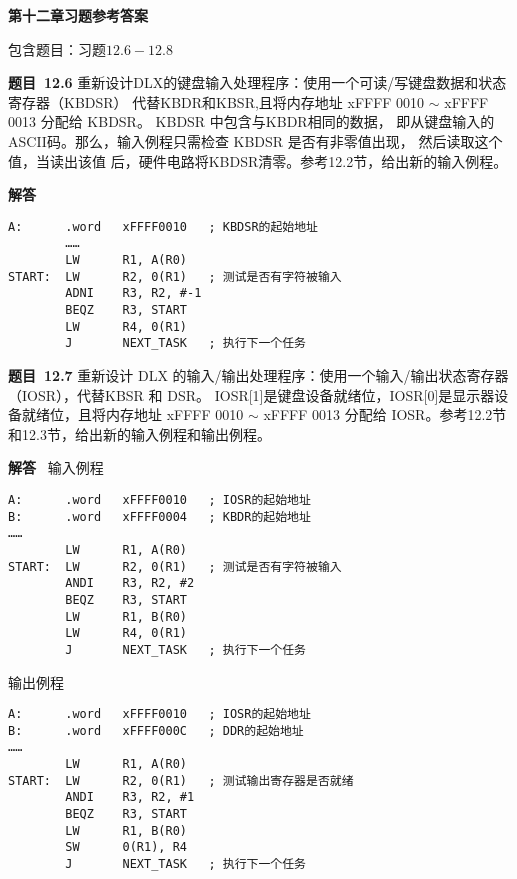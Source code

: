 \documentclass[10pt,a4paper,UTF8]{ctexart}
\newcommand{\problemname}{待定义}
\newenvironment{problem}{\begin{shaded}\par\noindent\textbf{题目\  \problemname}}{\end{shaded}\par}
\newenvironment{solution}{\par\noindent\textbf{解答}\ }{\par}
\begin{document}
\begin{center}
\LARGE\textbf{第十二章习题参考答案}
\end{center}

{\kaishu 包含题目：习题$12.6-12.8$}



	



\renewcommand{\problemname}{12.6}
\begin{problem}
	重新设计DLX的键盘输入处理程序：使用一个可读/写键盘数据和状态寄存器（KBDSR）
	代替KBDR和KBSR,且将内存地址 xFFFF 0010 $\sim$ xFFFF 0013 分配给 KBDSR。
	KBDSR 中包含与KBDR相同的数据，
	即从键盘输入的ASCII码。那么，输入例程只需检查 KBDSR 是否有非零值出现，
	然后读取这个值，当读出该值
	后，硬件电路将KBDSR清零。参考12.2节，给出新的输入例程。
\end{problem}

\begin{solution}
	\begin{lstlisting}
A:		.word	xFFFF0010	; KBDSR的起始地址
		…… 
		LW		R1, A(R0) 
START:	LW		R2, 0(R1)	; 测试是否有字符被输入
		ADNI	R3, R2, #-1 
		BEQZ	R3, START 
		LW		R4, 0(R1) 
		J		NEXT_TASK	; 执行下一个任务
	\end{lstlisting}
\end{solution}


\renewcommand{\problemname}{12.7}
\begin{problem}
	重新设计 DLX 的输入/输出处理程序：使用一个输入/输出状态寄存器（IOSR），代替KBSR 和 DSR。
	IOSR[1]是键盘设备就绪位，IOSR[0]是显示器设备就绪位，且将内存地址 xFFFF 0010 $\sim$ xFFFF 0013 分配给
	IOSR。参考12.2节和12.3节，给出新的输入例程和输出例程。
\end{problem}

\begin{solution}
	输入例程
	\begin{lstlisting}
A:		.word	xFFFF0010	; IOSR的起始地址
B:		.word	xFFFF0004	; KBDR的起始地址
…… 
		LW		R1, A(R0) 
START:	LW		R2, 0(R1) 	; 测试是否有字符被输入
		ANDI	R3, R2, #2 
		BEQZ	R3, START 
		LW		R1, B(R0) 
		LW		R4, 0(R1) 
		J		NEXT_TASK	; 执行下一个任务
	\end{lstlisting}
	输出例程
	\begin{lstlisting}
A:		.word	xFFFF0010	; IOSR的起始地址
B:		.word	xFFFF000C	; DDR的起始地址
…… 
		LW		R1, A(R0) 
START:	LW		R2, 0(R1) 	; 测试输出寄存器是否就绪
		ANDI	R3, R2, #1 
		BEQZ	R3, START 
		LW		R1, B(R0) 
		SW		0(R1), R4 
		J		NEXT_TASK	; 执行下一个任务
	\end{lstlisting}
\end{solution}
\end{document}

